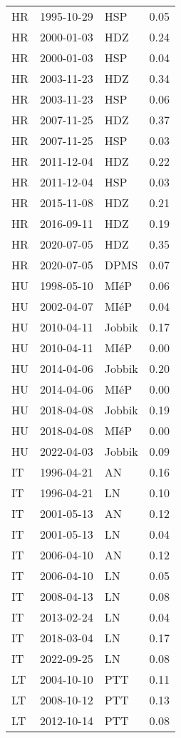 \begin{longtable}{lllr}
  HR & 1995-10-29 & HSP & 0.05 \\ 
  HR & 2000-01-03 & HDZ & 0.24 \\ 
  HR & 2000-01-03 & HSP & 0.04 \\ 
  HR & 2003-11-23 & HDZ & 0.34 \\ 
  HR & 2003-11-23 & HSP & 0.06 \\ 
  HR & 2007-11-25 & HDZ & 0.37 \\ 
  HR & 2007-11-25 & HSP & 0.03 \\ 
  HR & 2011-12-04 & HDZ & 0.22 \\ 
  HR & 2011-12-04 & HSP & 0.03 \\ 
  HR & 2015-11-08 & HDZ & 0.21 \\ 
  HR & 2016-09-11 & HDZ & 0.19 \\ 
  HR & 2020-07-05 & HDZ & 0.35 \\ 
  HR & 2020-07-05 & DPMS & 0.07 \\ 
  HU & 1998-05-10 & MIéP & 0.06 \\ 
  HU & 2002-04-07 & MIéP & 0.04 \\ 
  HU & 2010-04-11 & Jobbik & 0.17 \\ 
  HU & 2010-04-11 & MIéP & 0.00 \\ 
  HU & 2014-04-06 & Jobbik & 0.20 \\ 
  HU & 2014-04-06 & MIéP & 0.00 \\ 
  HU & 2018-04-08 & Jobbik & 0.19 \\ 
  HU & 2018-04-08 & MIéP & 0.00 \\ 
  HU & 2022-04-03 & Jobbik & 0.09 \\ 
  IT & 1996-04-21 & AN & 0.16 \\ 
  IT & 1996-04-21 & LN & 0.10 \\ 
  IT & 2001-05-13 & AN & 0.12 \\ 
  IT & 2001-05-13 & LN & 0.04 \\ 
  IT & 2006-04-10 & AN & 0.12 \\ 
  IT & 2006-04-10 & LN & 0.05 \\ 
  IT & 2008-04-13 & LN & 0.08 \\ 
  IT & 2013-02-24 & LN & 0.04 \\ 
  IT & 2018-03-04 & LN & 0.17 \\ 
  IT & 2022-09-25 & LN & 0.08 \\ 
  LT & 2004-10-10 & PTT & 0.11 \\ 
  LT & 2008-10-12 & PTT & 0.13 \\ 
  LT & 2012-10-14 & PTT & 0.08 \\ 

\end{longtable}
